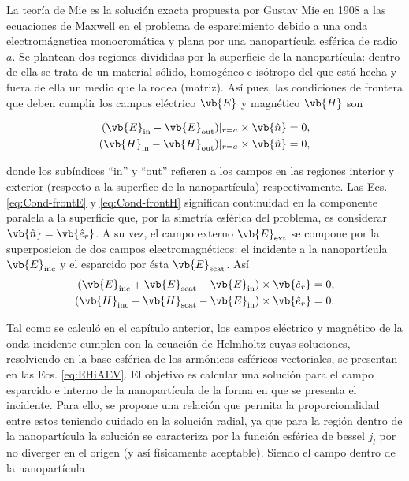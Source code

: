
La teoría de Mie \cite{bohren1998absorption} es la solución exacta propuesta por Gustav Mie en 1908 a las ecuaciones de Maxwell en el problema de esparcimiento debido a una onda electromágnetica monocromática y plana por una nanopartícula esférica de radio $a$. Se plantean dos regiones divididas por la superficie de la nanopartícula: dentro de ella se trata de un material sólido, homogéneo e isótropo del que está hecha y fuera de ella un medio que la rodea (matriz). Así pues, las condiciones de frontera que deben cumplir los campos eléctrico $\vb{E}$ y magnético $\vb{H}$ son

%
	\begin{align}
	(\vb{E}_{\text{in}}-\vb{E}_{\text{out}})|_{r=a}\times\vb{\hat{n}}&=0,\label{eq:Cond-frontE}\\
	(\vb{H}_{\text{in}}-\vb{H}_{\text{out}})|_{r=a}\times\vb{\hat{n}}&=0,
	\label{eq:Cond-frontH}
	\end{align}
%

donde los subíndices ``in'' y ``out'' refieren a los campos en las regiones interior y exterior (respecto a la superfice de la nanopartícula) respectivamente. Las Ecs. \eqref{eq:Cond-frontE} y \eqref{eq:Cond-frontH} significan continuidad en la componente paralela a la superficie que, por la simetría esférica del problema, es considerar $\vb{\hat{n}}=\vb{\hat{e}_r}$. A su vez, el campo externo $\vb{E}_{\text{ext}}$ se compone por la superposicion de dos campos electromagnéticos: el incidente a la nanopartícula $\vb{E}_{\text{inc}}$ y el esparcido por ésta $\vb{E}_{\text{scat}}$. Así
%
	\begin{align}
	(\vb{E}_{\text{inc}}+\vb{E}_{\text{scat}}-\vb{E}_{\text{in}})\times\vb{\hat{e}_r}&=0,\label{eq:Cond-EsfE}\\
	(\vb{H}_{\text{inc}}+\vb{H}_{\text{scat}}-\vb{E}_{\text{in}})\times\vb{\hat{e}_r}&=0.
	\label{eq:Cond-EsfH}
	\end{align}
%

Tal como se calculó en el capítulo anterior, los campos eléctrico y magnético de la onda incidente cumplen con la ecuación de Helmholtz cuyas soluciones, resolviendo en la base esférica de los armónicos esféricos vectoriales, se presentan en las Ecs. \eqref{eq:EHiAEV}. El objetivo es calcular una solución para el campo esparcido e interno de la nanopartícula de la forma en que se presenta el incidente. Para ello, se propone una relación que permita la proporcionalidad entre estos teniendo cuidado en la solución radial, ya que para la región dentro de la nanopartícula la solución se caracteriza por la función esférica de bessel $j_l$ por no diverger en el origen (y así físicamente aceptable). Siendo el campo dentro de la nanopartícula


